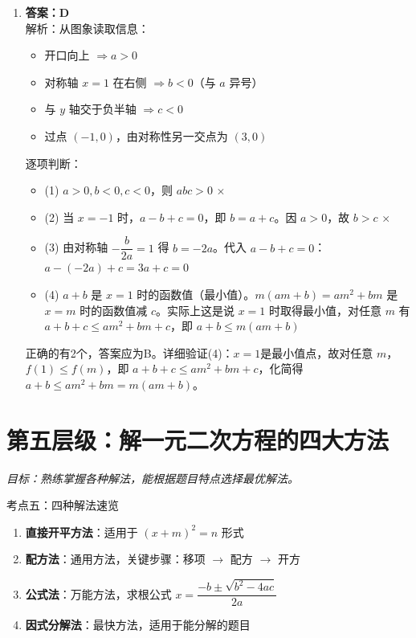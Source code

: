 \documentclass[12pt, a4paper]{article}
\begin{document}
\begin{answerbox}
\begin{enumerate}
        \item \textbf{答案：D} \\
        解析：从图象读取信息：
        \begin{itemize}
            \item 开口向上 $\Rightarrow a > 0$
            \item 对称轴 $x = 1$ 在右侧 $\Rightarrow b < 0$（与 $a$ 异号）
            \item 与 $y$ 轴交于负半轴 $\Rightarrow c < 0$
            \item 过点 $(-1,0)$，由对称性另一交点为 $(3,0)$
        \end{itemize}
        逐项判断：
        \begin{itemize}
            \item (1) $a>0, b<0, c<0$，则 $abc > 0$ \textbf{$\times$}
            \item (2) 当 $x=-1$ 时，$a-b+c=0$，即 $b=a+c$。因 $a>0$，故 $b > c$ \textbf{$\times$}
            \item (3) 由对称轴 $-\dfrac{b}{2a}=1$ 得 $b=-2a$。代入 $a-b+c=0$：$a-(-2a)+c=3a+c=0$ \checkmark
            \item (4) $a+b$ 是 $x=1$ 时的函数值（最小值）。$m(am+b) = am^2+bm$ 是 $x=m$ 时的函数值减 $c$。实际上这是说 $x=1$ 时取得最小值，对任意 $m$ 有 $a+b+c \leqslant am^2+bm+c$，即 $a+b \leqslant m(am+b)$ \checkmark
        \end{itemize}
        正确的有2个，答案应为B。详细验证(4)：$x=1$是最小值点，故对任意 $m$，$f(1) \leqslant f(m)$，即 $a+b+c \leqslant am^2+bm+c$，化简得 $a+b \leqslant am^2+bm = m(am+b)$。
    \end{enumerate}
\end{answerbox}

\section{第五层级：解一元二次方程的四大方法}
\textit{目标：熟练掌握各种解法，能根据题目特点选择最优解法。}

\begin{conceptbox}{考点五：四种解法速览}
    \begin{enumerate}
        \item \textbf{直接开平方法}：适用于 $(x+m)^2 = n$ 形式
        \item \textbf{配方法}：通用方法，关键步骤：移项 $\to$ 配方 $\to$ 开方
        \item \textbf{公式法}：万能方法，求根公式 $x = \dfrac{-b \pm \sqrt{b^2-4ac}}{2a}$
        \item \textbf{因式分解法}：最快方法，适用于能分解的题目
    \end{enumerate}
\end{conceptbox}
\end{document}
